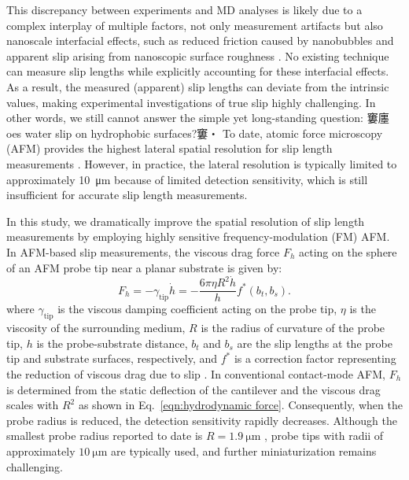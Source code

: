 \documentclass[journal=jacsat,manuscript=article]{achemso}
\begin{document}
This discrepancy between experiments and MD analyses is likely due to a complex interplay of multiple factors, not only measurement artifacts \cite{Pradhan2025-yl} but also nanoscale interfacial effects, such as reduced friction caused by nanobubbles \cite{Li2016-ly} and apparent slip arising from nanoscopic surface roughness \cite{Lund2012-cr}. No existing technique can measure slip lengths while explicitly accounting for these interfacial effects. As a result, the measured (apparent) slip lengths can deviate from the intrinsic values, making experimental investigations of true slip highly challenging. In other words, we still cannot answer the simple yet long-standing question: 窶廛oes water slip on hydrophobic surfaces?窶・
To date, atomic force microscopy (AFM) provides the highest lateral spatial resolution for slip length measurements \cite{Zhu2012-wb, Vinogradova1995-ct, Vinogradova2003-gh, Li2022-qs}. However, in practice, the lateral resolution is typically limited to approximately \SI{10}{\micro\metre} because of limited detection sensitivity, which is still insufficient for accurate slip length measurements.

In this study, we dramatically improve the spatial resolution of slip length measurements by employing highly sensitive frequency-modulation (FM) AFM. In AFM-based slip measurements, the viscous drag force \(F_h\) acting on the sphere of an AFM probe tip near a planar substrate is given by:
\begin{equation}
F_h=-\gamma_{\text{tip}} \dot{h}=-\frac{6\pi\eta R^2 \dot{h}}{h} f^* (b_t,b_s). \label{eqn:hydrodynamic force}
\end{equation}
where \(\gamma_{\text{tip}}\) is the viscous damping coefficient acting on the probe tip,  \(\eta\) is the viscosity of the surrounding medium, \(R\) is the radius of curvature of the probe tip, \(h\) is the probe-substrate distance, \(b_t\) and \(b_s\) are the slip lengths at the probe tip and substrate surfaces, respectively, and \(f^*\) is a correction factor representing the reduction of viscous drag due to slip \cite{Vinogradova1995-ct}. In conventional contact-mode AFM, \(F_h\) is determined from the static deflection of the cantilever and the viscous drag scales with \(R^2\) as shown in Eq.~\ref{eqn:hydrodynamic force}.  Consequently, when the probe radius is reduced, the detection sensitivity rapidly decreases. Although the smallest probe radius reported to date is \(R = \SI{1.9}{\micro\metre}\) \cite{Vinogradova2003-gh}, probe tips with radii of approximately \(\SI{10}{\micro\metre}\) \cite{Li2022-qs} are typically used, and further miniaturization remains challenging.
\end{document}
